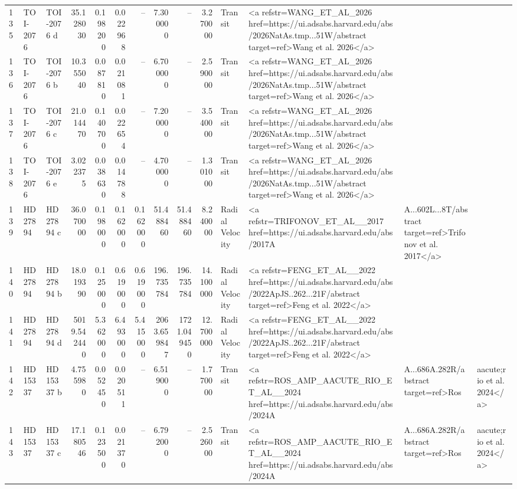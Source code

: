 \begin{tabular}{lllrrrrrrrll}
135 & TOI-2076 & TOI-2076 d & 35.128030 & 0.198200 & 0.022968 & -- & 7.300000 & -- & 3.270000 & Transit & <a refstr=WANG_ET_AL_2026 href=https://ui.adsabs.harvard.edu/abs/2026NatAs.tmp...51W/abstract target=ref>Wang et al. 2026</a> \\
136 & TOI-2076 & TOI-2076 b & 10.355040 & 0.087810 & 0.021081 & -- & 6.700000 & -- & 2.590000 & Transit & <a refstr=WANG_ET_AL_2026 href=https://ui.adsabs.harvard.edu/abs/2026NatAs.tmp...51W/abstract target=ref>Wang et al. 2026</a> \\
137 & TOI-2076 & TOI-2076 c & 21.014470 & 0.140700 & 0.022654 & -- & 7.200000 & -- & 3.540000 & Transit & <a refstr=WANG_ET_AL_2026 href=https://ui.adsabs.harvard.edu/abs/2026NatAs.tmp...51W/abstract target=ref>Wang et al. 2026</a> \\
138 & TOI-2076 & TOI-2076 e & 3.022375 & 0.038630 & 0.014788 & -- & 4.700000 & -- & 1.301000 & Transit & <a refstr=WANG_ET_AL_2026 href=https://ui.adsabs.harvard.edu/abs/2026NatAs.tmp...51W/abstract target=ref>Wang et al. 2026</a> \\
139 & HD 27894 & HD 27894 c & 36.070000 & 0.198000 & 0.162000 & 0.162000 & 51.488460 & 51.488460 & 8.240000 & Radial Velocity & <a refstr=TRIFONOV_ET_AL__2017 href=https://ui.adsabs.harvard.edu/abs/2017A&A...602L...8T/abstract target=ref>Trifonov et al. 2017</a> \\
140 & HD 27894 & HD 27894 b & 18.019390 & 0.125000 & 0.619000 & 0.619000 & 196.735784 & 196.735784 & 14.100000 & Radial Velocity & <a refstr=FENG_ET_AL__2022 href=https://ui.adsabs.harvard.edu/abs/2022ApJS..262...21F/abstract target=ref>Feng et al. 2022</a> \\
141 & HD 27894 & HD 27894 d & 5019.542440 & 5.362000 & 6.493000 & 5.415000 & 2063.659847 & 1721.049450 & 12.700000 & Radial Velocity & <a refstr=FENG_ET_AL__2022 href=https://ui.adsabs.harvard.edu/abs/2022ApJS..262...21F/abstract target=ref>Feng et al. 2022</a> \\
142 & HD 15337 & HD 15337 b & 4.755980 & 0.052450 & 0.020511 & -- & 6.519000 & -- & 1.770000 & Transit & <a refstr=ROS_AMP_AACUTE_RIO_ET_AL__2024 href=https://ui.adsabs.harvard.edu/abs/2024A&A...686A.282R/abstract target=ref>Ros&aacute;rio et al. 2024</a> \\
143 & HD 15337 & HD 15337 c & 17.180546 & 0.123500 & 0.021370 & -- & 6.792000 & -- & 2.526000 & Transit & <a refstr=ROS_AMP_AACUTE_RIO_ET_AL__2024 href=https://ui.adsabs.harvard.edu/abs/2024A&A...686A.282R/abstract target=ref>Ros&aacute;rio et al. 2024</a> \\

\end{tabular}
